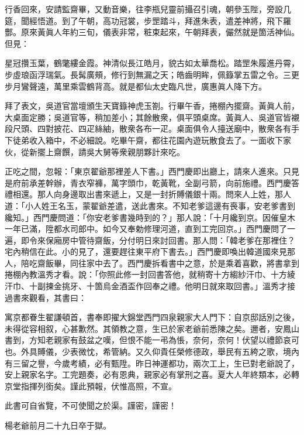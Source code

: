行香回來，安請監齋畢，又動音樂，往李瓶兒靈前攝召引魂，朝參玉陛，旁設几筵，聞經悟道。到了午朝，高功冠裳，步罡踏斗，拜進朱表，遣差神將，飛下羅酆。原來黃眞人年約三旬，儀表非常，粧束起來，午朝拜表，儼然就是箇活神仙。但見：

\begin{myquote} 
星冠攢玉葉，鶴氅縷金霞。神清似長江皓月，貌古如太華喬松。踏罡朱履進丹霄，步虛琅函浮瑞氣。長髯廣頰，修行到無漏之天；皓齒明眸，佩籙掌五雷之令。三更步月鸞聲遠，萬里乘雲鶴背高。就是都仙太史臨凡世，廣惠眞人降下方。
\end{myquote} 

拜了表文，吳道官當壇頒生天寶籙神虎玉劄。行畢午香，捲棚內擺齋。黃眞人前，大桌面定勝；吳道官等，稍加差小；其餘散衆，俱平頭桌席。黃眞人、吳道官皆襯段尺頭、四對披花、四疋絲紬，散衆各布一疋。桌面俱令人擡送廟中，散衆各有手下徒弟收入箱中，不必細說。吃畢午齋，都往花園內遊玩散食去了。一面收下家伙，從新擺上齋饌，請吳大舅等衆親朋夥計來吃。

正吃之間，忽報：「東京翟爺那裡差人下書。」西門慶即出廳上，請來人進來。只見是府前承差幹辦，青衣窄褲，萬字頭巾，乾黃靴，全副弓箭，向前施禮。西門慶答禮相還。那人向身邊取出書來遞上，又是一封折賻儀銀十兩。問來人上姓，那人道：「小人姓王名玉，蒙翟爺差遣，送此書來。不知老爹這邊有䘮事，安老爹書到纔知。」西門慶問道：「你安老爹書幾時到的？」那人說：「十月纔到京。因催皇木一年已滿，陞都水司郎中。如今又奉勅修理河道，直到工完回京。」西門慶問了一遍，即令來保廂房中管待齋飯，分付明日來討回書。那人問：「韓老爹在那裡住？宅內稍信在此。小的見了，還要趕往東平府下書去。」西門慶即喚出韓道國來見那人，陪吃齋飯畢，同往家中去了。西門慶拆看書中之意，於是乘着喜歡，將書拿到捲棚內教溫秀才看。{}說：「你照此修一封回書答他，就稍寄十方縐紗汗巾、十方綾汗巾、十副揀金挑牙、十箇烏金酒盃作回奉之禮。他明日就來取回書。」溫秀才接過書來觀看，其書曰：

\begin{myquote}[\markfont]
寓京都眷生翟謙頓首，書奉即擢大錦堂西門四泉親家大人門下：自京邸話別之後，未得從容相叙，心甚歉然。其領教之意，生已於家老爺前悉陳之矣。邇者，安鳳山書到，方知老親家有鼓盆之嘆，但恨不能一弔為悵，奈何，奈何！伏望以禮節哀可也。外具賻儀，少表微忱，希管納。又久仰貴任榮修德政，舉民有五絝之歌，境內有三留之譽，今歲考績，必有甄陞。昨日神運都功，兩次工上，生已對老爺說了，安上親家名字。工完題奏，必有恩典，親家必有掌刑之喜。夏大人年終類本，必轉京堂指揮列銜矣。謹此預報，伏惟高照，不宣。

{}此書可自省覽，不可使聞之於渠。謹密，謹密！

{}

楊老爺前月二十九日卒于獄。{}

\end{myquote}

